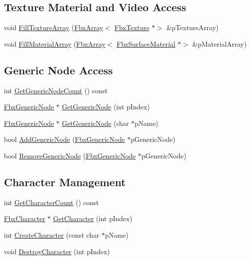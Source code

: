 \subsection*{Texture Material and Video Access}
\begin{DoxyCompactItemize}
\item 
void \hyperlink{class_fbx_scene_aa1c0e661ae74b086bbdc546e1fdcff66}{Fill\+Texture\+Array} (\hyperlink{class_fbx_array}{Fbx\+Array}$<$ \hyperlink{class_fbx_texture}{Fbx\+Texture} $\ast$$>$ \&p\+Texture\+Array)
\item 
void \hyperlink{class_fbx_scene_aa70ce6e170685f3e4eec9a86ed9ead3d}{Fill\+Material\+Array} (\hyperlink{class_fbx_array}{Fbx\+Array}$<$ \hyperlink{class_fbx_surface_material}{Fbx\+Surface\+Material} $\ast$$>$ \&p\+Material\+Array)
\end{DoxyCompactItemize}
\subsection*{Generic Node Access}
\begin{DoxyCompactItemize}
\item 
int \hyperlink{class_fbx_scene_affc3c8713672b7d0c3bf857a62cb400b}{Get\+Generic\+Node\+Count} () const
\item 
\hyperlink{class_fbx_generic_node}{Fbx\+Generic\+Node} $\ast$ \hyperlink{class_fbx_scene_abb58edd9139efcf577a2c910202fd842}{Get\+Generic\+Node} (int p\+Index)
\item 
\hyperlink{class_fbx_generic_node}{Fbx\+Generic\+Node} $\ast$ \hyperlink{class_fbx_scene_ad5a5ab95c93631d8c39acc39da689313}{Get\+Generic\+Node} (char $\ast$p\+Name)
\item 
bool \hyperlink{class_fbx_scene_aedfcc888eda10e083a10646875390d6d}{Add\+Generic\+Node} (\hyperlink{class_fbx_generic_node}{Fbx\+Generic\+Node} $\ast$p\+Generic\+Node)
\item 
bool \hyperlink{class_fbx_scene_ada01a14ed31636b615d6e95c1f33e2ca}{Remove\+Generic\+Node} (\hyperlink{class_fbx_generic_node}{Fbx\+Generic\+Node} $\ast$p\+Generic\+Node)
\end{DoxyCompactItemize}
\subsection*{Character Management}
\begin{DoxyCompactItemize}
\item 
int \hyperlink{class_fbx_scene_ab425b0d2df9318234ed67e7276ff823c}{Get\+Character\+Count} () const
\item 
\hyperlink{class_fbx_character}{Fbx\+Character} $\ast$ \hyperlink{class_fbx_scene_a1ac7e6cc72f3d3e89dcece88cb9e1fd3}{Get\+Character} (int p\+Index)
\item 
int \hyperlink{class_fbx_scene_a5095a3dbd1407bda6c12e5aa29f63049}{Create\+Character} (const char $\ast$p\+Name)
\item 
void \hyperlink{class_fbx_scene_ade61cc3b6e1e0fc8fbfb7d664b1d59b1}{Destroy\+Character} (int p\+Index)
\end{DoxyCompactItemize}
